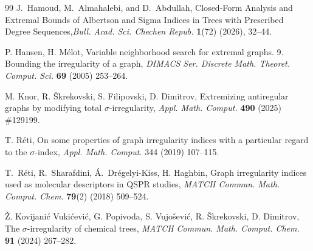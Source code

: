 \documentclass[12pt]{amsart}
\begin{document}
\begin{thebibliography}{99}
J.~Hamoud, M.~Almahalebi, and D.~Abdullah, Closed-Form Analysis and Extremal Bounds of Albertson and Sigma Indices in Trees with Prescribed Degree Sequences,\emph{Bull. Acad. Sci. Chechen Repub.} \textbf{1}(72) (2026), 32--44. 


 P. Hansen, H. M\'elot, Variable neighborhood search for extremal graphs. 9. Bounding the irregularity of a graph, \emph{DIMACS Ser. Discrete Math. Theoret. Comput. Sci.} \textbf{69} (2005) 253--264.


 M. Knor, R. \v{S}krekovski, S. Filipovski, D. Dimitrov, Extremizing antiregular graphs by modifying total $\sigma$-irregularity, \emph{Appl. Math. Comput.} \textbf{490} (2025) \#129199.


 T. R\'eti, On some properties of graph irregularity indices with a particular regard to the $\sigma$-index, \emph{Appl. Math. Comput.} 344 (2019) 107--115.

 T.~R\'eti, R.~Sharafdini, \'A.~Dr\'egelyi-Kiss, H. Haghbin, Graph irregularity indices used as molecular descriptors in QSPR studies, \emph{MATCH Commun. Math. Comput. Chem.} \textbf{79}(2) (2018) 509--524.


 \v{Z}. Kovijani\'c Vuki\'cevi\'c, G. Popivoda, S. Vujo\v{s}evi\'c, R. \v{S}krekovski, D. Dimitrov, The $\sigma$-irregularity of chemical trees, \emph{MATCH Commun. Math. Comput. Chem.} \textbf{91} (2024) 267--282.

\end{thebibliography}

 


\end{document}
